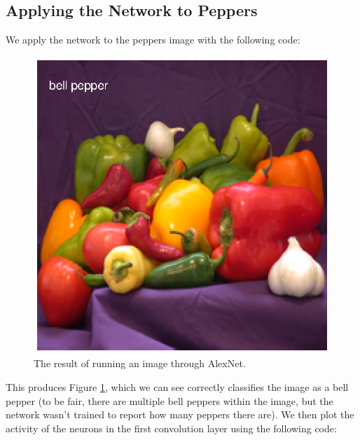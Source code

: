 \documentclass[11pt, oneside]{article}
\begin{document}
\subsection{Applying the Network to Peppers}

We apply the network to the peppers image with the following code:


\begin{figure}[ht!]
\includegraphics[width=1\textwidth]{pepper_classify.eps}
\caption{The result of running an image through AlexNet.}
\label{fig:pepClassified}
\end{figure}

This produces Figure \ref{fig:pepClassified}, which we can see correctly classifies the image as a bell pepper (to be fair, there are multiple bell peppers within the image, but the network wasn't trained to report how many peppers there are). We then plot the activity of the neurons in the first convolution layer using the following code:

\end{document}
